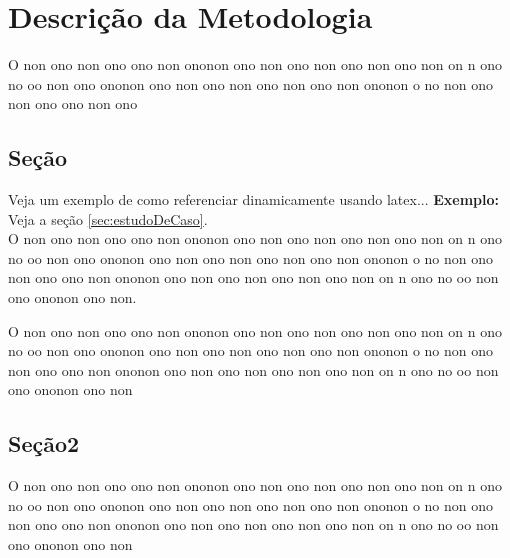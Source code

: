 \chapter{Descrição da Metodologia}
\label{ref:metodologia}

O non ono non ono ono non ononon ono non ono non ono non ono non on
n ono no oo non ono ononon ono  non ono non ono non ono non ononon o 
no non ono non ono ono non ono

\section{Seção}
Veja um exemplo de como referenciar dinamicamente usando latex...
{\bf Exemplo:} Veja a seção \ref{sec:estudoDeCaso}. \\
O non ono non ono ono non ononon ono non ono non ono non ono non on
n ono no oo non ono ononon ono  non ono non ono non ono non ononon o 
no non ono non ono ono non ononon ono non ono non ono non ono non on
n ono no oo non ono ononon ono  non.

O non ono non ono ono non ononon ono non ono non ono non ono non on
n ono no oo non ono ononon ono  non ono non ono non ono non ononon o 
no non ono non ono ono non ononon ono non ono non ono non ono non on
n ono no oo non ono ononon ono  non

\section{Seção2}
\label{sec:sessao}
O non ono non ono ono non ononon ono non ono non ono non ono non on
n ono no oo non ono ononon ono  non ono non ono non ono non ononon o 
no non ono non ono ono non ononon ono non ono non ono non ono non on
n ono no oo non ono ononon ono  non
